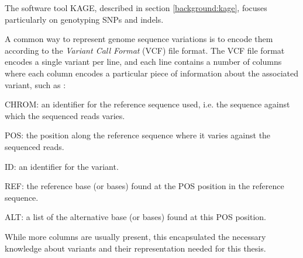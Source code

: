 The software tool KAGE, described in section \ref{background:kage}, focuses particularly on genotyping SNPs and indels.

A common way to represent genome sequence variations is to encode them according to the \textit{Variant Call Format} (VCF) file format.
The VCF file format encodes a single variant per line, and each line contains a number of columns where each column encodes a particular piece of information about the associated variant, such as \cite{vcf}:
\begin{compactenum}
  \item
    CHROM: an identifier for the reference sequence used, i.e. the sequence against which the sequenced reads varies.
  \item
    POS: the position along the reference sequence where it varies against the sequenced reads.
  \item
    ID: an identifier for the variant.
  \item
    REF: the reference base (or bases) found at the POS position in the reference sequence.
  \item
    ALT: a list of the alternative base (or bases) found at this POS position.
\end{compactenum}
While more columns are usually present, this encapsulated the necessary knowledge about variants and their representation needed for this thesis.



